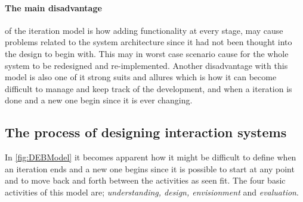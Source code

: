 \paragraph{The main disadvantage} of the iteration model is how adding functionality at every stage, may cause problems related to the system architecture since it had not been thought into the design to begin with.
This may in worst case scenario cause for the whole system to be redesigned and re-implemented.
Another disadvantage with this model is also one of it strong suits and allures which is how it can become difficult to manage and keep track of the development, and when a iteration is done and a new one begin since it is ever changing.


\subsection{The process of designing interaction systems}\label{sec:Iterative1}
In \cref{fig:DEBModel} it becomes apparent how it might be difficult to define when an iteration ends and a new one begins since it is possible to start at any point and to move back and forth between the activities as seen fit.
The four basic activities of this model are; \textit{understanding, design, envisionment} and \textit{evaluation}.

